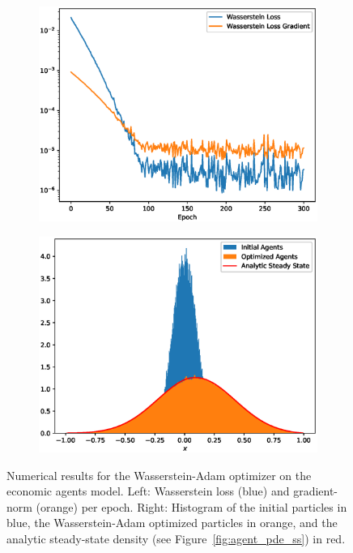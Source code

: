 \documentclass{article}
\begin{document}
\begin{figure}[h]
    \centering
    \begin{subfigure}[b]{0.51\textwidth}
        \centering
        \includegraphics[width=\textwidth]{figures/WassersteinAgentsLoss.eps}
    \end{subfigure}%
    \begin{subfigure}[b]{0.51\textwidth}
        \centering
        \includegraphics[width=\textwidth]{figures/WassersteinAgentsParticles.eps}
    \end{subfigure}
    \caption{Numerical results for the Wasserstein-Adam optimizer on the economic agents model. Left: Wasserstein loss (blue) and gradient-norm (orange) per epoch. Right: Histogram of the initial particles in blue, the Wasserstein-Adam optimized particles in orange, and the analytic steady-state density (see Figure~\ref{fig:agent_pde_ss}) in red.}
    \label{fig:w2_agents}
\end{figure}
\end{document}
